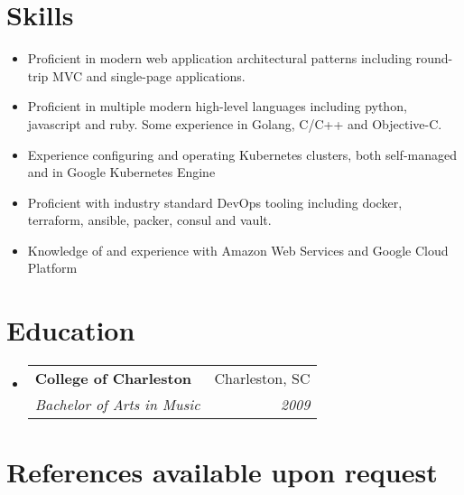 \documentclass[letterpaper,11pt]{article}
\makeatletter
\newcommand{\resumeItem}[2]{
  \item\small{
    \textbf{#1}{ #2 \vspace{-2pt}}
  }
}
\newcommand{\resumeSubheading}[4]{
  \vspace{-1pt}\item
    \begin{tabular*}{0.97\textwidth}{l@{\extracolsep{\fill}}r}
      \textbf{#1} & #2 \\
      \textit{\small#3} & \textit{\small #4} \\
    \end{tabular*}\vspace{-5pt}
}
\newcommand{\resumeSubItem}[2]{\resumeItem{#1}{#2}\vspace{-4pt}}
\newcommand{\resumeSubHeadingListStart}{\begin{itemize}[leftmargin=*]}
\newcommand{\resumeSubHeadingListEnd}{\end{itemize}}
\makeatother
\begin{document}
\section{Skills}
  \resumeSubHeadingListStart
    \resumeSubItem{}
      {Proficient in modern web application architectural patterns including round-trip MVC and single-page applications.}
    \resumeSubItem{}
      {Proficient in multiple modern high-level languages including python, javascript and ruby. Some experience in Golang, C/C++ and Objective-C.}
    \resumeSubItem{}
      {Experience configuring and operating Kubernetes clusters, both self-managed and in Google Kubernetes Engine}
    \resumeSubItem{}
      {Proficient with industry standard DevOps tooling including docker, terraform, ansible, packer, consul and vault.}
    \resumeSubItem{}
      {Knowledge of and experience with Amazon Web Services and Google Cloud Platform}
  \resumeSubHeadingListEnd

\section{Education}
  \resumeSubHeadingListStart
    \resumeSubheading
      {College of Charleston}{Charleston, SC}
      {Bachelor of Arts in Music}{2009}
  \resumeSubHeadingListEnd

\section{References available upon request}
\end{document}
